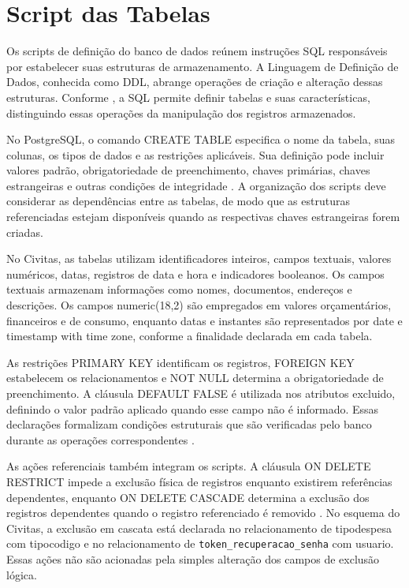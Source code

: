 \section{Script das Tabelas}

Os scripts de definição do banco de dados reúnem instruções SQL responsáveis por estabelecer suas estruturas de armazenamento. A Linguagem de Definição de Dados, conhecida como DDL, abrange operações de criação e alteração dessas estruturas. Conforme \textcite{WattEng2014}, a SQL permite definir tabelas e suas características, distinguindo essas operações da manipulação dos registros armazenados.

No PostgreSQL, o comando CREATE TABLE especifica o nome da tabela, suas colunas, os tipos de dados e as restrições aplicáveis. Sua definição pode incluir valores padrão, obrigatoriedade de preenchimento, chaves primárias, chaves estrangeiras e outras condições de integridade \parencite{PostgreSQLCreateTable2026}. A organização dos scripts deve considerar as dependências entre as tabelas, de modo que as estruturas referenciadas estejam disponíveis quando as respectivas chaves estrangeiras forem criadas.

No Civitas, as tabelas utilizam identificadores inteiros, campos textuais, valores numéricos, datas, registros de data e hora e indicadores booleanos. Os campos textuais armazenam informações como nomes, documentos, endereços e descrições. Os campos numeric(18,2) são empregados em valores orçamentários, financeiros e de consumo, enquanto datas e instantes são representados por date e timestamp with time zone, conforme a finalidade declarada em cada tabela.

As restrições PRIMARY KEY identificam os registros, FOREIGN KEY estabelecem os relacionamentos e NOT NULL determina a obrigatoriedade de preenchimento. A cláusula DEFAULT FALSE é utilizada nos atributos excluido, definindo o valor padrão aplicado quando esse campo não é informado. Essas declarações formalizam condições estruturais que são verificadas pelo banco durante as operações correspondentes \parencite{PostgreSQLConstraints2026}.

As ações referenciais também integram os scripts. A cláusula ON DELETE RESTRICT impede a exclusão física de registros enquanto existirem referências dependentes, enquanto ON DELETE CASCADE determina a exclusão dos registros dependentes quando o registro referenciado é removido \parencite{PostgreSQLConstraints2026}. No esquema do Civitas, a exclusão em cascata está declarada no relacionamento de tipodespesa com tipocodigo e no relacionamento de \texttt{token\_recuperacao\_senha} com usuario. Essas ações não são acionadas pela simples alteração dos campos de exclusão lógica.

